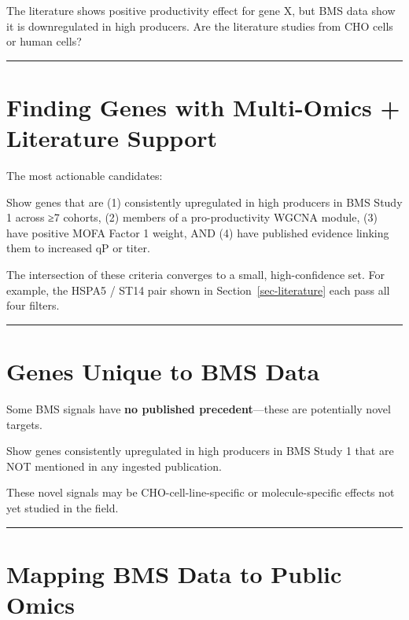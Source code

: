 \documentclass[
  letterpaper,
  oneside,
  open=any]{scrbook}
\begin{document}
The literature shows positive productivity effect for gene X, but BMS
data show it is downregulated in high producers. Are the literature
studies from CHO cells or human cells?

\begin{center}\rule{0.5\linewidth}{0.5pt}\end{center}

\section{Finding Genes with Multi-Omics + Literature
Support}\label{finding-genes-with-multi-omics-literature-support}

The most actionable candidates:

Show genes that are (1) consistently upregulated in high producers in
BMS Study 1 across ≥7 cohorts, (2) members of a pro-productivity WGCNA
module, (3) have positive MOFA Factor 1 weight, AND (4) have published
evidence linking them to increased qP or titer.

The intersection of these criteria converges to a small, high-confidence
set. For example, the HSPA5 / ST14 pair shown in
Section~\ref{sec-literature} each pass all four filters.

\begin{center}\rule{0.5\linewidth}{0.5pt}\end{center}

\section{Genes Unique to BMS Data}\label{genes-unique-to-bms-data}

Some BMS signals have \textbf{no published precedent}---these are
potentially novel targets.

Show genes consistently upregulated in high producers in BMS Study 1
that are NOT mentioned in any ingested publication.

These novel signals may be CHO-cell-line-specific or molecule-specific
effects not yet studied in the field.

\begin{center}\rule{0.5\linewidth}{0.5pt}\end{center}

\section{Mapping BMS Data to Public
Omics}\label{mapping-bms-data-to-public-omics}
\end{document}
